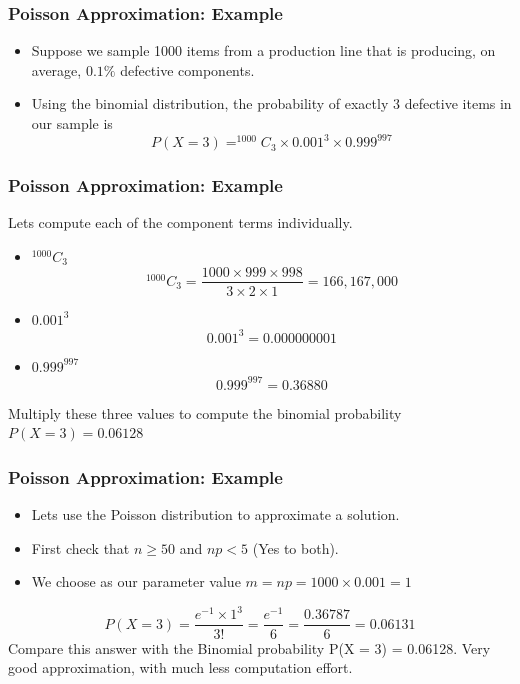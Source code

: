 \begin{frame}
\frametitle{Poisson Approximation: Example}

\begin{itemize}
\item Suppose we sample 1000 items from a production line that is producing, on
average, $0.1\%$ defective components.
\item Using the binomial distribution, the probability of exactly 3 defective items in
our sample is
\[P(X = 3) = ^{1000}C_{3} \times 0.001^{3} \times 0.999^{997}\]
\end{itemize}
\end{frame}

\begin{frame}
\frametitle{Poisson Approximation: Example}
Lets compute each of the component terms individually.

\begin{itemize}
\item $^{1000}C_{3}$
\[^{1000}C_{3} = \frac{1000 \times 999 \times 998}{3 \times 2 \times 1} = 166,167,000\]
\item $0.001^3$
\[0.001^3 = 0.000000001\]
\item $0.999^{997}$
\[0.999^{997} = 0.36880\]
\end{itemize}


Multiply these three values to compute the binomial probability
$P(X = 3) = 0.06128$
\end{frame}

\begin{frame}
\frametitle{Poisson Approximation: Example}
\begin{itemize}
\item Lets use the Poisson distribution to approximate a solution.
\item First check that $n \geq 50$ and $np < 5$ (Yes to both).
\item We choose as our parameter value $m = np = 1000 \times 0.001 = 1$
\end{itemize}
\[P(X = 3) = \frac{e^{-1} \times 1^3}{3!} = \frac{e^{-1}}{6} = \frac{0.36787}{6} = 0.06131 \]
Compare this answer with the Binomial probability
P(X = 3) = 0.06128.
Very good approximation, with much less computation effort.
\end{frame}


 
